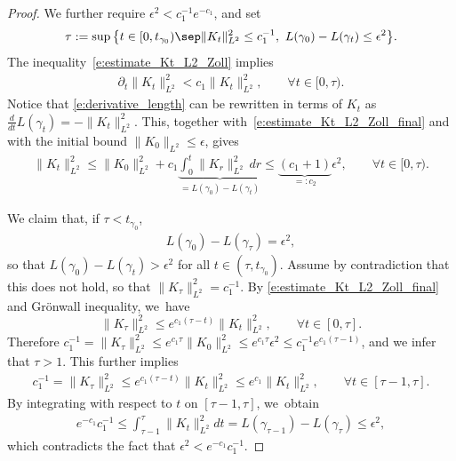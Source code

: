 \begin{proof}
We further require $\epsilon^2< c_1^{-1}e^{-c_1}$, and set
\begin{align*}
\tau:=\sup\big\{ t\in[0,t_{\gamma_0})\sep \|K_t\|_{L^2}^2\leq c_1^{-1},\ L(\gamma_0)-L(\gamma_t)\leq\epsilon^2 \big\}.
\end{align*}
The inequality~\eqref{e:estimate_Kt_L2_Zoll} implies
\begin{align}\label{e:estimate_Kt_L2_Zoll_final}
\partial_t \|K_t\|_{L^2}^2
<
c_1 \|K_t\|_{L^2}^2,
\qquad \forall t\in[0,\tau).
\end{align}
Notice that \eqref{e:derivative_length} can be rewritten in terms of $K_t$ as
$\tfrac{d}{dt} L(\gamma_t) = -\|K_t\|_{L^2}^2$. This, togeth\-er with~\eqref{e:estimate_Kt_L2_Zoll_final} and with the initial bound $\|K_{0}\|_{L^2}\leq\epsilon$, gives
\begin{align*}
\|K_{t}\|_{L^2}^2
\leq
\|K_{0}\|_{L^2}^2
+c_1\underbrace{\int_0^t \|K_{r}\|_{L^2}^2\,dr}_{=L(\gamma_0)-L(\gamma_t)}
\leq
\underbrace{(c_1+1)}_{=:c_2}\epsilon^2,\qquad
\forall t\in[0,\tau).
\end{align*}

We claim that, if $\tau<t_{\gamma_0}$,
\begin{align*}
L(\gamma_0)-L(\gamma_\tau)=\epsilon^2,
\end{align*}
so that $L(\gamma_0)-L(\gamma_t)>\epsilon^2$ for all $t\in(\tau,t_{\gamma_0})$.
Assume by contradiction that this does not hold, so that $\|K_\tau\|_{L^2}^2= c_1^{-1}$.
By \eqref{e:estimate_Kt_L2_Zoll_final} and Grönwall inequality, we~have
\[
\|K_{\tau}\|_{L^2}^2 \leq e^{c_1(\tau-t)} \|K_{t}\|_{L^2}^2,\qquad\forall t\in[0,\tau].
\]
Therefore
$c_1^{-1}=\|K_{\tau}\|_{L^2}^2\leq e^{c_1\tau}\|K_0\|_{L^2}^2\leq e^{c_1\tau}\epsilon^2\leq c_1^{-1}e^{c_1(\tau-1)}$,
and we infer that $\tau>1$.
This further implies
\begin{align*}
c_1^{-1} = \|K_{\tau}\|_{L^2}^2 \leq e^{c_1(\tau-t)} \|K_{t}\|_{L^2}^2 \leq e^{c_1} \|K_{t}\|_{L^2}^2,\qquad\forall t\in[\tau-1,\tau].
\end{align*}
By integrating with respect to $t$ on $[\tau-1,\tau]$, we~obtain
\begin{align*}
e^{-c_1}c_1^{-1}
\leq
\int_{\tau-1}^{\tau} \|K_{t}\|_{L^2}^2dt
=
L(\gamma_{\tau-1})- L(\gamma_{\tau})
\leq
\epsilon^2,
\end{align*}
which contradicts the fact that $\epsilon^2<e^{-c_1}c_1^{-1}$.


\end{proof}
